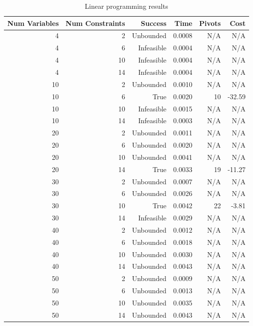 \begin{table}[ht]
    \centering
    \begin{tabular}{rrrrrr}
        \toprule
        Num Variables & Num Constraints & Success & Time & Pivots & Cost \\
        \midrule
        4 & 2 & Unbounded & 0.0008 & N/A & N/A \\
		4 & 6 & Infeasible & 0.0004 & N/A & N/A \\
		4 & 10 & Infeasible & 0.0004 & N/A & N/A \\
		4 & 14 & Infeasible & 0.0004 & N/A & N/A \\
		10 & 2 & Unbounded & 0.0010 & N/A & N/A \\
		10 & 6 & True & 0.0020 & 10 & -32.59 \\
		10 & 10 & Infeasible & 0.0015 & N/A & N/A \\
		10 & 14 & Infeasible & 0.0003 & N/A & N/A \\
		20 & 2 & Unbounded & 0.0011 & N/A & N/A \\
		20 & 6 & Unbounded & 0.0020 & N/A & N/A \\
		20 & 10 & Unbounded & 0.0041 & N/A & N/A \\
		20 & 14 & True & 0.0033 & 19 & -11.27 \\
		30 & 2 & Unbounded & 0.0007 & N/A & N/A \\
		30 & 6 & Unbounded & 0.0026 & N/A & N/A \\
		30 & 10 & True & 0.0042 & 22 & -3.81 \\
		30 & 14 & Infeasible & 0.0029 & N/A & N/A \\
		40 & 2 & Unbounded & 0.0012 & N/A & N/A \\
		40 & 6 & Unbounded & 0.0018 & N/A & N/A \\
		40 & 10 & Unbounded & 0.0030 & N/A & N/A \\
		40 & 14 & Unbounded & 0.0043 & N/A & N/A \\
		50 & 2 & Unbounded & 0.0009 & N/A & N/A \\
		50 & 6 & Unbounded & 0.0013 & N/A & N/A \\
		50 & 10 & Unbounded & 0.0035 & N/A & N/A \\
		50 & 14 & Unbounded & 0.0043 & N/A & N/A \\
        \bottomrule
    \end{tabular}
    \caption{Linear programming results}
    \label{tab:lp-results}
\end{table}